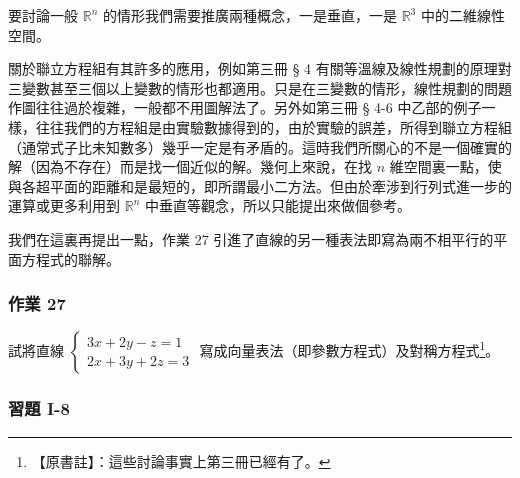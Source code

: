 要討論一般 $\mathbb{R}^n$ 的情形我們需要推廣兩種概念，一是垂直，一是 $\mathbb{R}^3$ 中的二維線性空間。

關於聯立方程組有其許多的應用，例如第三冊 § 4 有關等溫線及線性規劃的原理對三變數甚至三個以上變數的情形也都適用。只是在三變數的情形，線性規劃的問題作圖往往過於複雜，一般都不用圖解法了。另外如第三冊 § 4-6 中乙部的例子一樣，往往我們的方程組是由實驗數據得到的，由於實驗的誤差，所得到聯立方程組（通常式子比未知數多）幾乎一定是有矛盾的。這時我們所關心的不是一個確實的解（因為不存在）而是找一個近似的解。幾何上來說，在找 $n$ 維空間裏一點，使與各超平面的距離和是最短的，即所謂最小二方法。但由於牽涉到行列式進一步的運算或更多利用到 $\mathbb{R}^n$ 中垂直等觀念，所以只能提出來做個參考。

我們在這裏再提出一點，作業 27 引進了直線的另一種表法即寫為兩不相平行的平面方程式的聯解。

\subsubsection*{作業 27}\label{hw:b6s-1-27}
試將直線 $\left\{\begin{aligned} 3x+2y-z=1 \\ 2x+3y+2z=3 \end{aligned}\right.$ 寫成向量表法（即參數方程式）及對稱方程式\footnote{【原書註】：這些討論事實上第三冊已經有了。}。

\subsubsection*{習題 I-8}\label{sec:b6s-ex1-8}

